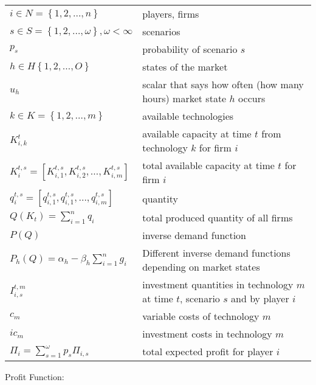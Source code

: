 \begin{longtable}[c]{l l}
$i\in N=\left\{ 1,2,\dots,n\right\}$                           & players, firms\\
$s\in S=\left\{ 1,2,\dots,\omega\right\}, \omega<\infty$       & scenarios\\
$p_s$                                                          & probability of scenario $s$\\
$h\in H \left\{ 1,2,\dots,O\right\}$													 & states of the market \\
$u_h$																														 & scalar that says how often (how many hours) market state $h$ occurs \\
$k\in K=\left\{ 1,2,\dots,m\right\}$                           & available technologies \\
$K_{i,k}^t$                                                     & available capacity at time $t$ from technology $k$ for firm $i$\\
$K_i^{t,s}=\left[K_{i,1}^{t,s},K_{i,2}^{t,s},\dots,K_{i,m}^{t,s}\right]$                                    & total available capacity at time $t$ for firm $i$\\

$q_{i}^{t,s}=\left[q_{i,1}^{t,s}, q_{i,1}^{t,s}, \dots, q_{i,m}^{t,s}\right]$                                                     & quantity\\
$Q(K_t)=\sum_{i=1}^nq_i$                                        & total produced quantity of all firms\\
$P(Q)$                                                          & inverse demand function\\
$P_h(Q)= \alpha_h - \beta_h \sum_{i=1}^n g_i$										& Different inverse demand functions depending on market states \\
$I_{i,s}^{t,m}$                                                 & investment quantities in technology $m$ at time $t$, scenario $s$ and by player $i$\\
$c_m$																														& variable costs of technology $m$	\\
$ic_m$																													& investment costs in technology $m$  \\
$\Pi_i=\sum_{s=1}^\omega p_s\Pi_{i,s}$                          & total expected profit for player $i$\\

\end{longtable}

Profit Function:

